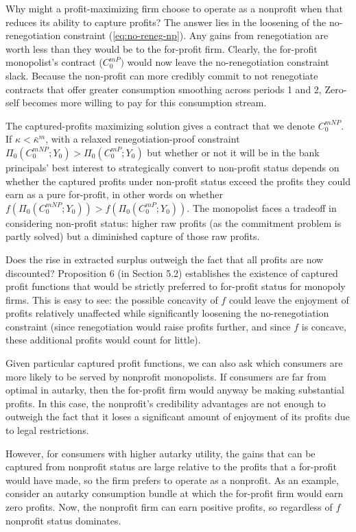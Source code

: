\documentclass[11pt,english]{article}
\theoremstyle{plain}
\theoremstyle{definition}
\begin{document}
Why might a profit-maximizing firm choose to operate as a nonprofit
when that reduces its ability to capture profits? The answer lies
in the loosening of the no-renegotiation constraint (\ref{eq:no-reneg-np}).
Any gains from renegotiation are worth less than they would be to
the for-profit firm. Clearly, the for-profit monopolist's contract
($C_{0}^{mP})$ would now leave the no-renegotiation constraint slack.
Because the non-profit can more credibly commit to not renegotiate
contracts that offer greater consumption smoothing across periods
1 and 2, Zero-self becomes more willing to pay for this consumption
stream.

The captured-profits maximizing solution gives a contract that we
denote $C_{0}^{mNP}$. If $\kappa<\bar{\kappa}^{m}$, with a relaxed
renegotiation-proof constraint $\Pi_{0}(C_{0}^{mNP};Y_{0})>\Pi_{0}(C_{0}^{mP};Y_{0})$
but whether or not it will be in the bank principals' best interest
to strategically convert to non-profit status depends on whether the
captured profits under non-profit status exceed the profits they could
earn as a pure for-profit, in other words on whether $f\left(\Pi_{0}(C_{0}^{mNP};Y_{0})\right)>f\left(\Pi_{0}(C_{0}^{mP};Y_{0})\right)$.
The monopolist faces a tradeoff in considering non-profit status:
higher raw profits (as the commitment problem is partly solved) but
a diminished capture of those raw profits.

Does the rise in extracted surplus outweigh the fact that all profits
are now discounted? Proposition 6 (in Section 5.2) establishes the
existence of captured profit functions that would be strictly preferred
to for-profit status for monopoly firms. This is easy to see: the
possible concavity of $f$ could leave the enjoyment of profits relatively
unaffected while significantly loosening the no-renegotiation constraint
(since renegotiation would raise profits further, and since $f$ is
concave, these additional profits would count for little).

Given particular captured profit functions, we can also ask which
consumers are more likely to be served by nonprofit monopolists. If
consumers are far from optimal in autarky, then the for-profit firm
would anyway be making substantial profits. In this case, the nonprofit's
credibility advantages are not enough to outweigh the fact that it
loses a significant amount of enjoyment of its profits due to legal
restrictions. 

However, for consumers with higher autarky utility, the gains that
can be captured from nonprofit status are large relative to the profits
that a for-profit would have made, so the firm prefers to operate
as a nonprofit. As an example, consider an autarky consumption bundle
at which the for-profit firm would earn zero profits. Now, the nonprofit
firm can earn positive profits, so regardless of $f$ nonprofit status
dominates.
\end{document}
